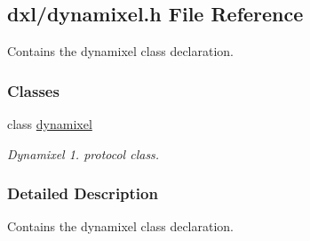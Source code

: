 \hypertarget{a00015}{}\subsection{dxl/dynamixel.h File Reference}
\label{a00015}


Contains the dynamixel class declaration.  


\subsubsection*{Classes}
\begin{DoxyCompactItemize}
\item 
class \hyperlink{a00004}{dynamixel}
\begin{DoxyCompactList}\small\item\em Dynamixel 1. protocol class. \end{DoxyCompactList}\end{DoxyCompactItemize}


\subsubsection{Detailed Description}
Contains the dynamixel class declaration. 

